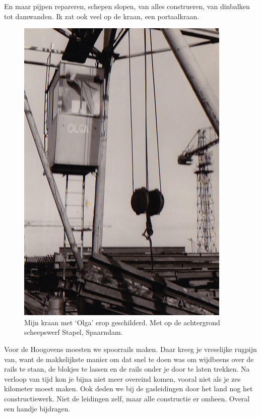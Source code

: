 \documentclass[12pt,twoside, openright]{memoir}
\begin{document}
En maar pijpen repareren, schepen slopen, van alles construeren, van dinbalken tot damwanden. Ik zat ook veel op de kraan, een portaalkraan. 

\begin{figure}
\centering
\includegraphics[width=\textwidth]{img/222kraan}
\caption*{\footnotesize Mijn kraan met `Olga' erop geschilderd. Met op de achtergrond scheepswerf Stapel, Spaarndam.}
\end{figure}

Voor de Hoogovens moesten we spoorrails maken. Daar kreeg je vreselijke rugpijn van, want de makkelijkste manier om dat snel te doen was om wijdbeens over de rails te staan, de blokjes te lassen en de rails onder je door te laten trekken. Na verloop van tijd kon je bijna niet meer overeind komen, vooral niet als je zes kilometer moest maken. Ook deden we bij de gasleidingen door het land nog het constructiewerk. Niet de leidingen zelf, maar alle constructie er omheen. Overal een handje bijdragen.
\end{document}
